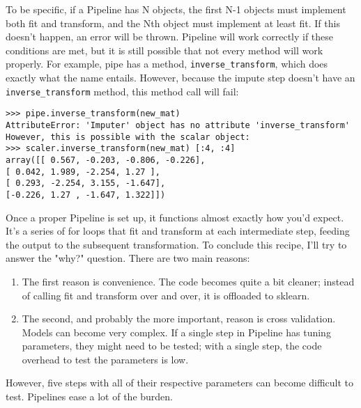 \documentclass[SKL-MASTER.tex]{subfiles}
\begin{document}
To be specific, if a Pipeline has N objects, the first N-1 objects must implement both fit and
transform, and the Nth object must implement at least fit. If this doesn't happen, an error
will be thrown.
Pipeline will work correctly if these conditions are met, but it is still possible that not every
method will work properly. For example, pipe has a method, \texttt{inverse\_transform}, which
does exactly what the name entails. However, because the impute step doesn't have an
\texttt{inverse\_transform} method, this method call will fail:
\begin{framed}
\begin{verbatim}
>>> pipe.inverse_transform(new_mat)
AttributeError: 'Imputer' object has no attribute 'inverse_transform'
However, this is possible with the scalar object:
>>> scaler.inverse_transform(new_mat) [:4, :4]
array([[ 0.567, -0.203, -0.806, -0.226],
[ 0.042, 1.989, -2.254, 1.27 ],
[ 0.293, -2.254, 3.155, -1.647],
[-0.226, 1.27 , -1.647, 1.322]])
\end{verbatim}
\end{framed}
Once a proper Pipeline is set up, it functions almost exactly how you'd expect. It's a series
of for loops that fit and transform at each intermediate step, feeding the output to the
subsequent transformation.
To conclude this recipe, I'll try to answer the "why?" question. There are two main reasons:
\begin{enumerate}
\item The first reason is convenience. The code becomes quite a bit cleaner; instead of
calling fit and transform over and over, it is offloaded to sklearn.
\item The second, and probably the more important, reason is cross validation. Models
can become very complex. If a single step in Pipeline has tuning parameters, they
might need to be tested; with a single step, the code overhead to test the parameters
is low. 
\end{enumerate}
However, five steps with all of their respective parameters can become difficult
to test. Pipelines ease a lot of the burden.
\end{document}
